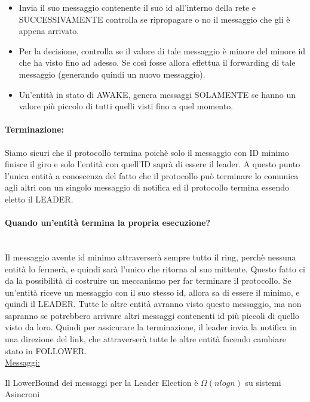 \begin{itemize}
    \item Invia il suo messaggio contenente il suo id all'interno della rete e
          SUCCESSIVAMENTE controlla se ripropagare o no il messaggio che gli è appena
          arrivato.
    \item Per la decisione, controlla se  il valore di tale messaggio è minore del
          minore id che ha visto fino ad adesso. Se così fosse allora effettua il
          forwarding di tale messaggio (generando quindi un nuovo messaggio).
    \item Un'entità in stato di AWAKE, genera messaggi SOLAMENTE se hanno un
          valore più piccolo di tutti quelli visti fino a quel momento.
\end{itemize}

\paragraph{Terminazione:} Siamo sicuri che il protocollo termina poichè solo il
messaggio con ID minimo finisce il giro e solo l'entità con quell'ID saprà di
essere il leader. A questo punto l'unica entità a conoscenza del fatto che il
protocollo può terminare lo comunica agli altri con un singolo messaggio di
notifica ed il protocollo termina essendo eletto il LEADER.

\paragraph{Quando un'entità termina la propria esecuzione?}\ \\
Il messaggio avente id minimo attraverserà sempre tutto il ring, perchè nessuna
entità lo fermerà, e quindi sarà l'unico che ritorna al suo mittente. Questo
fatto ci da la possibilità di costruire un meccanismo per far terminare il
protocollo. Se un'entità riceve un messaggio con il suo stesso id, allora sa di
essere il minimo, e quindi il LEADER. Tutte le altre entità avranno visto questo
messaggio, ma non sapranno se potrebbero arrivare altri messaggi contenenti id
più piccoli di quello visto da loro. Quindi per assicurare la terminazione, il
leader invia la notifica in una direzione del link, che attraverserà tutte le
altre entità facendo cambiare stato in FOLLOWER.\\
\underline{Messaggi:}

\begin{center}
    Il LowerBound dei messaggi per la Leader Election è $\Omega(nlogn)$ su sistemi
    Asincroni
\end{center}{}

